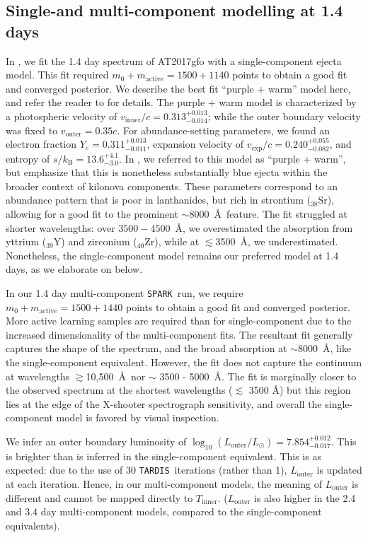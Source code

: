 \documentclass[twocolumn,twocolappendix]{aastex63}
\def\SPARK{\texttt{SPARK}}
\def\TARDIS{\texttt{TARDIS}}
\def\V23{\citetalias{vieira23}}
\begin{document}
\subsection{Single-and multi-component modelling at 1.4 days}\label{ssc:1.4}

In \V23, we fit the 1.4 day spectrum of AT2017gfo with a single-component ejecta model. This fit required $m_0 + m_{\mathrm{active}} = 1500 + 1140$ points to obtain a good fit and converged posterior. We describe the best fit ``purple + warm'' model here, and refer the reader to \V23 for details. The purple + warm model is characterized by a photospheric velocity of $v_{\mathrm{inner}}/c = 0.313^{+0.013}_{-0.014}$; while the outer boundary velocity was fixed to $v_{\mathrm{outer}} = 0.35c$. For abundance-setting parameters, we found an electron fraction $Y_e = 0.311^{+0.013}_{-0.011}$, expansion velocity of $v_{\mathrm{exp}}/c = 0.240^{+0.055}_{-0.082}$, and entropy of $s / k_{\mathrm{B}} = 13.6^{+4.1}_{-3.0}$. In \V23, we referred to this model as ``purple + warm'', but emphasize that this is nonetheless substantially blue ejecta within the broader context of kilonova components. These parameters correspond to an abundance pattern that is poor in lanthanides, but rich in strontium (${}_{38}$Sr), allowing for a good fit to the prominent $\sim$8000~\AA~feature. The fit struggled at shorter wavelengths: over $3500-4500$~\AA, we overestimated the absorption from yttrium (${}_{39}$Y) and zirconium (${}_{40}$Zr), while at $\lesssim$3500~\AA, we underestimated. Nonetheless, the single-component model remains our preferred model at 1.4 days, as we elaborate on below.

In our 1.4 day multi-component \SPARK~run, we require $m_0 + m_{\mathrm{active}} = 1500 + 1440$ points to obtain a good fit and converged posterior. More active learning samples are required than for single-component due to the increased dimensionality of the multi-component fits. The resultant fit generally captures the shape of the spectrum, and the broad absorption at $\sim$8000~\AA, like the single-component equivalent. However, the fit does not capture the continuum at wavelengths $\gtrsim$10,500~\AA~nor $\sim$ 3500 - 5000~\AA. The fit is marginally closer to the observed spectrum at the shortest wavelengths ($\lesssim$ 3500 \AA) but this region lies at the edge of the X-shooter spectrograph sensitivity, and overall the single-component model is favored by visual inspection. 

We infer an outer boundary luminosity of $\log_{10} (L_{\mathrm{outer}}/L_{\odot}) = 7.854^{+0.012}_{-0.017}$. This is brighter than is inferred in the single-component equivalent. This is as expected: due to the use of 30 \TARDIS~iterations (rather than 1), $L_{\mathrm{outer}}$ is updated at each iteration. Hence, in our multi-component models, the meaning of $L_{\mathrm{outer}}$ is different and cannot be mapped directly to $T_{\mathrm{inner}}$. ($L_{\mathrm{outer}}$ is also higher in the 2.4 and 3.4 day multi-component models, compared to the single-component equivalents).
\end{document}
